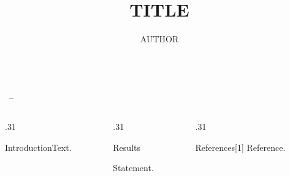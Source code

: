 \documentclass[final]{beamer}
\title{{{TITLE}}}
\author{{{AUTHOR}}}
\institute{Department of Mathematics, University}
\begin{document}
\begin{frame}[t]
\begin{center}{\Huge\bfseries\inserttitle}\\[0.5em]{\Large\insertauthor\ --\ \insertinstitute}\end{center}
\vspace{1em}
\begin{columns}[t]
\begin{column}{.31\linewidth}
\begin{block}{Introduction}Text.\end{block}
\end{column}
\begin{column}{.31\linewidth}
\begin{block}{Results}\begin{theorem}Statement.\end{theorem}\end{block}
\end{column}
\begin{column}{.31\linewidth}
\begin{block}{References}\small [1] Reference.\end{block}
\end{column}
\end{columns}
\end{frame}
\end{document}
